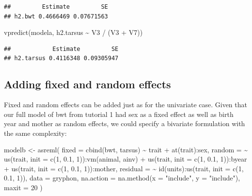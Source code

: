 \documentclass[
  12pt,
]{book}
\newenvironment{Shaded}{\begin{snugshade}}{\end{snugshade}}
\newcommand{\AttributeTok}[1]{\textcolor[rgb]{0.77,0.63,0.00}{#1}}
\newcommand{\DecValTok}[1]{\textcolor[rgb]{0.00,0.00,0.81}{#1}}
\newcommand{\FloatTok}[1]{\textcolor[rgb]{0.00,0.00,0.81}{#1}}
\newcommand{\FunctionTok}[1]{\textcolor[rgb]{0.00,0.00,0.00}{#1}}
\newcommand{\NormalTok}[1]{#1}
\newcommand{\OtherTok}[1]{\textcolor[rgb]{0.56,0.35,0.01}{#1}}
\newcommand{\SpecialCharTok}[1]{\textcolor[rgb]{0.00,0.00,0.00}{#1}}
\newcommand{\StringTok}[1]{\textcolor[rgb]{0.31,0.60,0.02}{#1}}
\begin{document}
\begin{verbatim}
##         Estimate         SE
## h2.bwt 0.4666469 0.07671563
\end{verbatim}

\begin{Shaded}
\begin{Highlighting}[]
\FunctionTok{vpredict}\NormalTok{(modela, h2.tarsus }\SpecialCharTok{\textasciitilde{}}\NormalTok{ V3 }\SpecialCharTok{/}\NormalTok{ (V3 }\SpecialCharTok{+}\NormalTok{ V7))}
\end{Highlighting}
\end{Shaded}

\begin{verbatim}
##            Estimate         SE
## h2.tarsus 0.4116348 0.09305947
\end{verbatim}

\hypertarget{adding-fixed-and-random-effects}{%
\subsection{Adding fixed and random effects}\label{adding-fixed-and-random-effects}}

Fixed and random effects can be added just as for the univariate case. Given that our full model of bwt from tutorial 1 had sex as a fixed effect as well as birth year and mother as random effects, we could specify a bivariate formulation with the same complexity:

\begin{Shaded}
\begin{Highlighting}[]
\NormalTok{modelb }\OtherTok{\textless{}{-}} \FunctionTok{asreml}\NormalTok{(}
  \AttributeTok{fixed =} \FunctionTok{cbind}\NormalTok{(bwt, tarsus) }\SpecialCharTok{\textasciitilde{}}\NormalTok{ trait }\SpecialCharTok{+} \FunctionTok{at}\NormalTok{(trait)}\SpecialCharTok{:}\NormalTok{sex,}
  \AttributeTok{random =} \SpecialCharTok{\textasciitilde{}} \FunctionTok{us}\NormalTok{(trait, }\AttributeTok{init =} \FunctionTok{c}\NormalTok{(}\DecValTok{1}\NormalTok{, }\FloatTok{0.1}\NormalTok{, }\DecValTok{1}\NormalTok{))}\SpecialCharTok{:}\FunctionTok{vm}\NormalTok{(animal, ainv) }\SpecialCharTok{+}
    \FunctionTok{us}\NormalTok{(trait, }\AttributeTok{init =} \FunctionTok{c}\NormalTok{(}\DecValTok{1}\NormalTok{, }\FloatTok{0.1}\NormalTok{, }\DecValTok{1}\NormalTok{))}\SpecialCharTok{:}\NormalTok{byear }\SpecialCharTok{+}
    \FunctionTok{us}\NormalTok{(trait, }\AttributeTok{init =} \FunctionTok{c}\NormalTok{(}\DecValTok{1}\NormalTok{, }\FloatTok{0.1}\NormalTok{, }\DecValTok{1}\NormalTok{))}\SpecialCharTok{:}\NormalTok{mother,}
  \AttributeTok{residual =} \SpecialCharTok{\textasciitilde{}} \FunctionTok{id}\NormalTok{(units)}\SpecialCharTok{:}\FunctionTok{us}\NormalTok{(trait, }\AttributeTok{init =} \FunctionTok{c}\NormalTok{(}\DecValTok{1}\NormalTok{, }\FloatTok{0.1}\NormalTok{, }\DecValTok{1}\NormalTok{)),}
  \AttributeTok{data =}\NormalTok{ gryphon,}
  \AttributeTok{na.action =} \FunctionTok{na.method}\NormalTok{(}\AttributeTok{x =} \StringTok{"include"}\NormalTok{, }\AttributeTok{y =} \StringTok{"include"}\NormalTok{),}
  \AttributeTok{maxit =} \DecValTok{20}
\NormalTok{)}
\end{Highlighting}
\end{Shaded}
\end{document}
